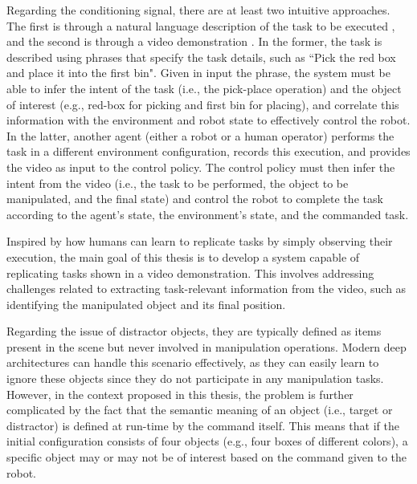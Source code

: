Regarding the conditioning signal, there are at least two intuitive approaches. The first is through a natural language description of the task to be executed \cite{stepputtis2020language,mees2022calvin,brohan2022rt}, and the second is through a video demonstration \cite{dasari2021transformers_one_shot,mandi2022towards_more_generalizable_one_shot}. 
\newline In the former, the task is described using phrases that specify the task details, such as ``Pick the red box and place it into the first bin". Given in input the phrase, the system must be able to infer the intent of the task (i.e., the pick-place operation) and the object of interest (e.g., red-box for picking and first bin for placing), and correlate this information with the environment and robot state to effectively control the robot.
\newline In the latter, another agent (either a robot or a human operator) performs the task in a different environment configuration, records this execution, and provides the video as input to the control policy. The control policy must then infer the intent from the video (i.e., the task to be performed, the object to be manipulated, and the final state) and control the robot to complete the task according to the agent's state, the environment's state, and the commanded task.

Inspired by how humans can learn to replicate tasks by simply observing their execution, the main goal of this thesis is to develop a system capable of replicating tasks shown in a video demonstration. This involves addressing challenges related to extracting task-relevant information from the video, such as identifying the manipulated object and its final position.

Regarding the issue of distractor objects, they are typically defined as items present in the scene but never involved in manipulation operations. Modern deep architectures can handle this scenario effectively, as they can easily learn to ignore these objects since they do not participate in any manipulation tasks. However, in the context proposed in this thesis, the problem is further complicated by the fact that the semantic meaning of an object (i.e., target or distractor) is defined at run-time by the command itself. This means that if the initial configuration consists of four objects (e.g., four boxes of different colors), a specific object may or may not be of interest based on the command given to the robot.

